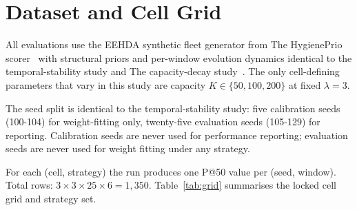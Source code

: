 \section{Dataset and Cell Grid}

All evaluations use the EEHDA synthetic fleet generator from
The HygienePrio scorer~\cite{paper4hygieneprio} with structural priors and per-window
evolution dynamics identical to the temporal-stability study and
The capacity-decay study~\cite{paper6capacity}. The only cell-defining parameters that
vary in this study are capacity $K \in \{50, 100, 200\}$ at fixed
$\lambda = 3$.

The seed split is identical to the temporal-stability study: five calibration seeds
(100-104) for weight-fitting only, twenty-five evaluation seeds
(105-129) for reporting. Calibration seeds are never used for
performance reporting; evaluation seeds are never used for weight
fitting under any strategy.

For each (cell, strategy) the run produces one P@50 value per (seed,
window). Total rows: $3 \times 3 \times 25 \times 6 = 1{,}350$.
Table~\ref{tab:grid} summarises the locked cell grid and strategy set.



